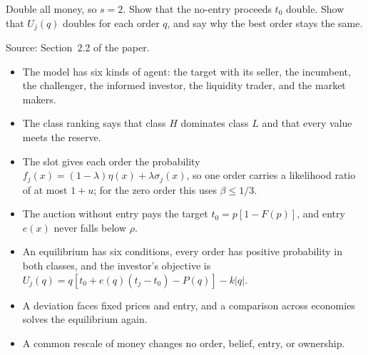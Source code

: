 \begin{checkyourself}
Double all money, so \(s=2\).
Show that the no-entry proceeds \(t_0\) double.
Show that \(U_j(q)\) doubles for each order \(q\), and say why the best order stays the same.
\label{q:model-scale}
\end{checkyourself}

{\small\color{notegrey}Source: Section~2.2 of the paper.}

\begin{chaptersummary}
\begin{itemize}
\item The model has six kinds of agent: the target with its seller, the incumbent, the challenger, the informed investor, the liquidity trader, and the market makers.
\item The class ranking says that class \(H\) dominates class \(L\) and that every value meets the reserve.
\item The slot gives each order the probability \(f_j(x)=(1-\lambda)\eta(x)+\lambda\sigma_j(x)\), so one order carries a likelihood ratio of at most \(1+u\); for the zero order this uses \(\beta\le1/3\).
\item The auction without entry pays the target \(t_0=p[1-F(p)]\), and entry \(e(x)\) never falls below \(\rho\).
\item An equilibrium has six conditions, every order has positive probability in both classes, and the investor's objective is \(U_j(q)=q[t_0+e(q)(t_j-t_0)-P(q)]-k|q|\).
\item A deviation faces fixed prices and entry, and a comparison across economies solves the equilibrium again.
\item A common rescale of money changes no order, belief, entry, or ownership.
\end{itemize}
\end{chaptersummary}

\answersection


